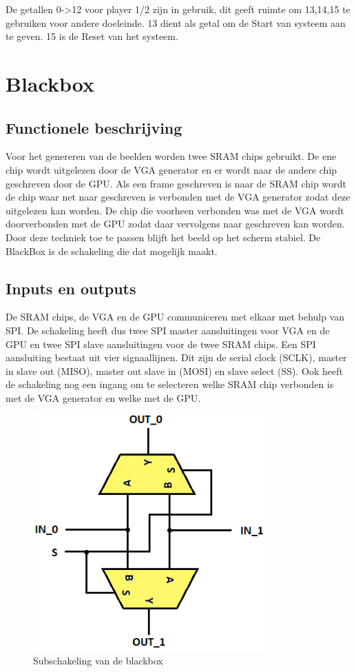 \documentclass[oneside,dutch]{tudelft-report}
\begin{document}
De getallen 0->12 voor player 1/2 zijn in gebruik, dit geeft ruimte om 13,14,15 te gebruiken voor andere doeleinde. 13 dient als getal om de Start van systeem aan te geven. 15 is de Reset van het systeem.
\newpage

\chapter{Blackbox}
\section{Functionele beschrijving}
Voor het genereren van de beelden worden twee SRAM chips gebruikt. De ene chip wordt uitgelezen door de VGA generator en er wordt naar de andere chip geschreven door de GPU. Als een frame geschreven is naar de SRAM chip wordt de chip waar net naar geschreven is verbonden met de VGA generator zodat deze uitgelezen kan worden. De chip die voorheen verbonden was met de VGA wordt doorverbonden met de GPU zodat daar vervolgens naar geschreven kan worden. Door deze techniek toe te passen blijft het beeld op het scherm stabiel. De BlackBox is de schakeling die dat mogelijk maakt.
\section{Inputs en outputs}
De SRAM chips, de VGA en de GPU communiceren met elkaar met behulp van SPI. De schakeling heeft dus twee SPI master aansluitingen voor VGA en de GPU en twee SPI slave aansluitingen voor de twee SRAM chips. Een SPI aansluiting bestaat uit vier signaallijnen. Dit zijn de serial clock (SCLK), master in slave out (MISO), master out slave in (MOSI) en slave select (SS). Ook heeft de schakeling nog een ingang om te selecteren welke SRAM chip verbonden is met de VGA generator en welke met de GPU.

\begin{figure}[H]
\center
\includegraphics[width=9cm]{./BlackBox_Circuit}
\caption{Subschakeling van de blackbox}
\label{sub-blackbox}
\end{figure}
\end{document}
